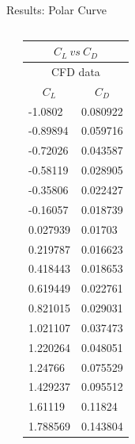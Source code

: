 \documentclass[english,10pt,a4paper,twoside]{beamer}
\begin{document}
\begin{frame}[shrink = 65]{Results: Polar Curve}
\begin{columns}[T]
			\rule{.1mm}{2.5\textheight}
		
			\begin{table}[H]
				\centering
				\begin{tabular}{|ll|}
					\hline
					\multicolumn{2}{|c|}{$C_L ~vs ~C_D$}                        \\ \hline
					\multicolumn{2}{|c|}{CFD data}                              \\ \hline
					\multicolumn{1}{|c|}{$C_L$}    & \multicolumn{1}{c|}{$C_D$} \\ \hline
					\multicolumn{1}{|l|}{-1.0802}  & 0.080922                   \\ \hline
					\multicolumn{1}{|l|}{-0.89894} & 0.059716                   \\ \hline
					\multicolumn{1}{|l|}{-0.72026} & 0.043587                   \\ \hline
					\multicolumn{1}{|l|}{-0.58119} & 0.028905                   \\ \hline
					\multicolumn{1}{|l|}{-0.35806} & 0.022427                   \\ \hline
					\multicolumn{1}{|l|}{-0.16057} & 0.018739                   \\ \hline
					\multicolumn{1}{|l|}{0.027939} & 0.01703                    \\ \hline
					\multicolumn{1}{|l|}{0.219787} & 0.016623                   \\ \hline
					\multicolumn{1}{|c|}{0.418443} & 0.018653                   \\ \hline
					\multicolumn{1}{|l|}{0.619449} & 0.022761                   \\ \hline
					\multicolumn{1}{|l|}{0.821015} & 0.029031                   \\ \hline
					\multicolumn{1}{|l|}{1.021107} & 0.037473                   \\ \hline
					\multicolumn{1}{|l|}{1.220264} & 0.048051                   \\ \hline
					\multicolumn{1}{|l|}{1.24766}  & 0.075529                   \\ \hline
					\multicolumn{1}{|l|}{1.429237} & 0.095512                   \\ \hline
					\multicolumn{1}{|l|}{1.61119}  & 0.11824                    \\ \hline
					\multicolumn{1}{|l|}{1.788569} & 0.143804                   \\ \hline
				\end{tabular}
			\end{table}
			

\end{columns}
\end{frame}
\end{document}
